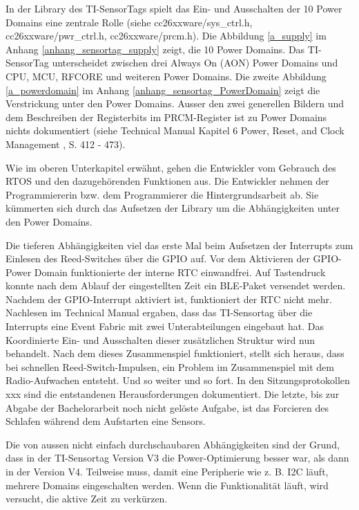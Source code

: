In der Library des TI-SensorTags spielt das Ein- und Ausschalten der 10 Power Domains eine zentrale Rolle (siehe cc26xxware/sys\_ctrl.h, cc26xxware/pwr\_ctrl.h, cc26xxware/prcm.h). Die Abbildung \ref{a_supply} im Anhang \ref{anhang_sensortag_supply} zeigt, die 10 Power Domains. Das TI-SensorTag unterscheidet zwischen drei Always On (AON) Power Domains und CPU, MCU, RFCORE und weiteren Power Domains. Die zweite Abbildung \ref{a_powerdomain} im Anhang \ref{anhang_sensortag_PowerDomain} zeigt die Verstrickung unter den Power Domains. Ausser den zwei generellen Bildern und dem Beschreiben der Registerbits im PRCM-Register ist zu Power Domains nichts dokumentiert (siehe Technical Manual Kapitel 6 Power, Reset, and Clock Management \cite{Sensortag_Manual}, S. 412 - 473).

Wie im oberen Unterkapitel erwähnt, gehen die Entwickler vom Gebrauch des RTOS und den dazugehörenden Funktionen aus. Die Entwickler nehmen der Programmiererin bzw. dem Programmierer die Hintergrundsarbeit ab. Sie kümmerten sich durch das Aufsetzen der Library um die Abhängigkeiten unter den Power Domains. 

Die tieferen Abhängigkeiten viel das erste Mal beim Aufsetzen der Interrupts zum Einlesen des Reed-Switches über die GPIO auf. Vor dem Aktivieren der GPIO-Power Domain funktionierte der interne RTC einwandfrei. Auf Tastendruck konnte nach dem Ablauf der eingestellten Zeit ein BLE-Paket versendet werden. Nachdem der GPIO-Interrupt aktiviert ist, funktioniert der RTC nicht mehr. Nachlesen im Technical Manual ergaben, dass das TI-Sensortag über die Interrupts eine Event Fabric mit zwei Unterabteilungen eingebaut hat. Das Koordinierte Ein- und Ausschalten dieser zusätzlichen Struktur wird nun behandelt. Nach dem dieses Zusammenspiel funktioniert, stellt sich heraus, dass bei schnellen Reed-Switch-Impulsen, ein Problem im Zusammenspiel mit dem Radio-Aufwachen entsteht. Und so weiter und so fort. In den Sitzungsprotokollen xxx  sind die entstandenen Herausforderungen dokumentiert. Die letzte, bis zur Abgabe der Bachelorarbeit noch nicht gelöste Aufgabe, ist das Forcieren des Schlafen während dem Aufstarten eine Sensors. 

Die von aussen nicht einfach durchschaubaren Abhängigkeiten sind der Grund, dass in der TI-Sensortag Version V3 die Power-Optimierung besser war, als dann in der Version V4. Teilweise muss, damit eine Peripherie wie z. B. I2C läuft, mehrere Domains eingeschalten werden. Wenn die Funktionalität läuft, wird versucht, die aktive Zeit zu verkürzen.


